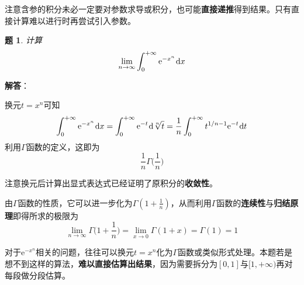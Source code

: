 \documentclass[a4paper,UTF8,fontset=windows,AutoFakeBold]{ctexart}
\newcommand*{\dr}{\hspace{0.07em}\mathrm{d}}
\newcommand*{\er}{\mathrm{e}}
\newcommand*{\note}{\noindent *}
\theoremstyle{ex}
\newtheorem{exercise}{题}
\newcommand{\sol}[1]{{\vspace{5pt}\kaishu\noindent\textbf{解答}：\vspace{-3pt}
\begin{compactitem}
    \item[] #1
\end{compactitem}
}}
\begin{document}
\note 注意含参的积分未必一定要对参数求导或积分，也可能\textbf{直接递推}得到结果。只有直接计算难以进行时再尝试引入参数。

\begin{framed}
\begin{exercise}
    计算
    $$\lim_{n\to\infty}\int_0^{+\infty}\er^{-x^n}\dr x$$
\end{exercise}
\sol{
    换元$t=x^n$可知
    $$\int_0^{+\infty}\er^{-x^n}\dr x=\int_0^{+\infty}\er^{-t}\dr\sqrt[n]{t}=\frac{1}{n}\int_0^{+\infty}t^{1/n-1}\er^{-t}\dr t$$
    利用$\Gamma$函数的定义，这即为
    $$\frac{1}{n}\Gamma\bigg(\frac{1}{n}\bigg)$$

    \note 注意换元后计算出显式表达式已经证明了原积分的\textbf{收敛性}。

    由$\Gamma$函数的性质，它可以进一步化为$\Gamma(1+\frac{1}{n})$，从而利用$\Gamma$函数的\textbf{连续性}与\textbf{归结原理}即得所求的极限为
    $$\lim_{n\to\infty}\Gamma\bigg(1+\frac{1}{n}\bigg)=\lim_{x\to0}\Gamma(1+x)=\Gamma(1)=1$$
}
\end{framed}

\note 对于$\er^{-x^n}$相关的问题，往往可以换元$t=x^n$化为$\Gamma$函数或类似形式处理。本题若是想不到这样的算法，\textbf{难以直接估算出结果}，因为需要拆分为$[0,1]$与$[1,+\infty)$再对每段做分段估算。
\end{document}
